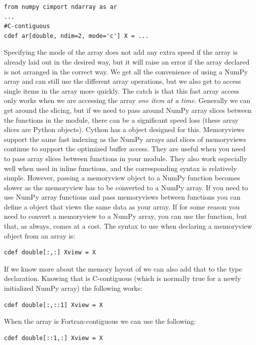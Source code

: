 \begin{lstlisting}
from numpy cimport ndarray as ar
...
#C-contiguous
cdef ar[double, ndim=2, mode='c'] X = ...
\end{lstlisting}
Specifying the mode of the array does not add any extra speed if the array is already laid out in the desired way, but it will raise an error if the array declared is not arranged in the correct way.
We get all the convenience of using a NumPy array and can still use the different array operations, but we also get to access single items in the array more quickly.
The catch is that this fast array access only works when we are accessing the array \textit{one item at a time}.
Generally we can get around the slicing, but if we need to pass around NumPy array slices between the functions in the module, there can be a significant speed loss (these array slices are Python objects).
Cython has a  object designed for this.
Memoryviews support the same fast indexing as the NumPy arrays and slices of memoryviews continue to support the optimized buffer access.
They are useful when you need to pass array slices between functions in your module.
They also work especially well when used in inline functions, and the corresponding syntax is relatively simple.
However, passing a memoryview object to a NumPy function becomes slower as the memoryview has to be converted to a NumPy array.
If you need to use NumPy array functions and pass memoryviews between functions you can define a  object that views the same data as your array.
If for some reason you need to convert a memoryview to a NumPy array, you can use the  function, but that, as always, comes at a cost.
The syntax to use when declaring a memoryview object from an array  is:
\begin{lstlisting}
cdef double[:,:] Xview = X
\end{lstlisting}
If we know more about the memory layout of  we can also add that to the type declaration.
Knowing that  is C-contiguous (which is normally true for a newly initialized NumPy array) the following works:
\begin{lstlisting}
cdef double[:,::1] Xview = X
\end{lstlisting}
When the array is Fortran-contiguous we can use the following:
\begin{lstlisting}
cdef double[::1,:] Xview = X
\end{lstlisting}


